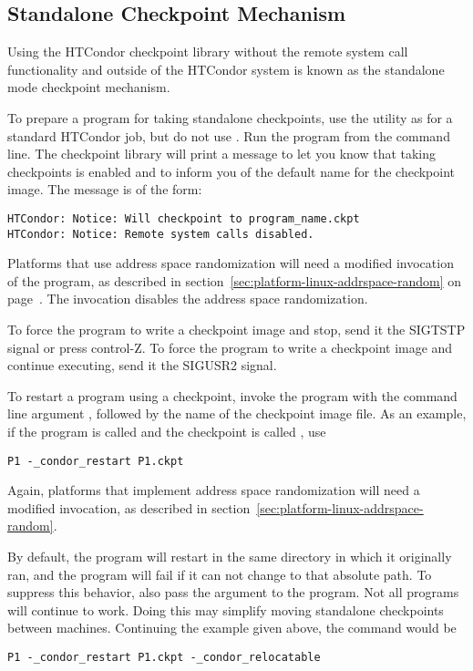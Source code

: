 \subsection{\label{sec:standalone-ckpt}Standalone Checkpoint Mechanism}

Using the HTCondor checkpoint library without the remote system call
functionality and outside of the HTCondor system is known as the standalone
mode checkpoint mechanism.

To prepare a program for taking standalone checkpoints, 
use the  utility as for a standard HTCondor job, 
but do not use .
Run the program from the command line.
The checkpoint library will print a message to let you know
that taking checkpoints is enabled and to inform you of the default
name for the checkpoint image.
The message is of the form:

\footnotesize
\begin{verbatim}
HTCondor: Notice: Will checkpoint to program_name.ckpt
HTCondor: Notice: Remote system calls disabled.
\end{verbatim}
\normalsize

Platforms that use address space randomization will need
a modified invocation of the program,
as described in section~\ref{sec:platform-linux-addrspace-random} on
page~\pageref{sec:platform-linux-addrspace-random}.
The invocation disables the address space randomization.
 
To force the program to write a checkpoint image and stop, send it
the SIGTSTP signal or press control-Z.  To force the program to 
write a checkpoint image and continue executing, send it the
SIGUSR2 signal.

To restart a program using a checkpoint, invoke the program
with the command line argument
,
followed by the name of the checkpoint image file.
As an example, if the program is called  and
the checkpoint is called , use
\begin{verbatim}
P1 -_condor_restart P1.ckpt
\end{verbatim}
Again, platforms that implement address space randomization will
need a modified invocation,
as described in section~\ref{sec:platform-linux-addrspace-random}.

By default, the program will restart in the same directory 
in which it originally ran, 
and the program will fail if it can not change to that absolute path.
To suppress this behavior, 
also pass the  argument 
to the program. 
Not all programs will continue to work.  
Doing this may simplify moving standalone checkpoints between machines.
Continuing the example given above,
the command would be
\begin{verbatim}
P1 -_condor_restart P1.ckpt -_condor_relocatable
\end{verbatim}

